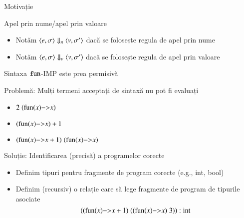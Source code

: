 \begin{section}{Motivație}
\begin{frame}
\begin{block}{Apel prin nume/apel prin valoare}
\begin{itemize}
\item
Notăm ${\langle{e,\sigma}\rangle}\Downarrow_n {\langle{v,\sigma'}\rangle}$ dacă se folosește regula de apel prin nume
\item
Notăm ${\langle{e,\sigma}\rangle}\Downarrow_v {\langle{v,\sigma'}\rangle}$ dacă se folosește regula de apel prin valoare
\end{itemize}
\end{block}
\end{frame}



\begin{frame}{Sintaxa $\mathrel{\text{\ttfamily fun}}$-IMP este prea permisivă}
\begin{block}{\alert{Problemă:} Mulți termeni acceptați de sintaxă nu pot fi evaluați}
   \begin{itemize}
   \item $2\;(\fun{x}{x})$
    \item $(\fun{x}{x}) + 1$
   \item $(\fun{x}{x + 1})\; (\fun{x}{x})$
   \end{itemize}
\end{block}
\vfill\begin{block}{Soluție:  Identificarea (precisă) a programelor corecte}
\begin{itemize}
\item Definim tipuri pentru fragmente de program corecte (e.g., int, bool)
\item Definim (recursiv) o relație care să lege fragmente de program de tipurile asociate
\[((\fun{x}{x + 1})\; ((\fun{x}{x})\; 3)) : \mbox{int}\]
\end{itemize}
\end{block}
\end{frame}

\end{section}

